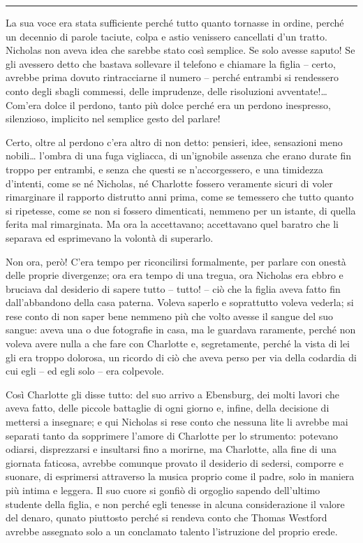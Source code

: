 \plainbreak{1}

La sua voce era stata sufficiente perché tutto quanto tornasse in ordine, perché un decennio di
parole taciute, colpa e astio venissero cancellati d'un tratto. Nicholas non aveva idea che sarebbe
stato così semplice. Se solo avesse saputo! Se gli avessero detto che bastava sollevare il telefono
e chiamare la figlia -- certo, avrebbe prima dovuto rintracciarne il numero -- perché entrambi si
rendessero conto degli sbagli commessi, delle imprudenze, delle risoluzioni avventate!\dots Com'era
dolce il perdono, tanto più dolce perché era un perdono inespresso, silenzioso, implicito nel
semplice gesto del parlare!

Certo, oltre al perdono c'era altro di non detto: pensieri, idee, sensazioni meno nobili\dots
l'ombra di una fuga vigliacca, di un'ignobile assenza che erano durate fin troppo per entrambi, e
senza che questi se n'accorgessero, e una timidezza d'intenti, come se né Nicholas, né Charlotte
fossero veramente sicuri di voler rimarginare il rapporto distrutto anni prima, come se temessero
che tutto quanto si ripetesse, come se non si fossero dimenticati, nemmeno per un istante, di quella
ferita mal rimarginata. Ma ora la accettavano; accettavano quel baratro che li separava ed
esprimevano la volontà di superarlo.

Non ora, però! C'era tempo per riconcilirsi formalmente, per parlare con onestà delle proprie
divergenze; ora era tempo di una tregua, ora Nicholas era ebbro e bruciava dal desiderio di sapere
tutto -- tutto! -- ciò che la figlia aveva fatto fin dall'abbandono della casa paterna. Voleva
saperlo e soprattutto voleva vederla; si rese conto di non saper bene nemmeno più che volto avesse
il sangue del suo sangue: aveva una o due fotografie in casa, ma le guardava raramente, perché non
voleva avere nulla a che fare con Charlotte e, segretamente, perché la vista di lei gli era troppo
dolorosa, un ricordo di ciò che aveva perso per via della codardia di cui egli -- ed egli solo --
era colpevole.

Così Charlotte gli disse tutto: del suo arrivo a Ebensburg, dei molti lavori che aveva fatto, delle
piccole battaglie di ogni giorno e, infine, della decisione di mettersi a insegnare; e qui Nicholas
si rese conto che nessuna lite li avrebbe mai separati tanto da sopprimere l'amore di Charlotte per
lo strumento: potevano odiarsi, disprezzarsi e insultarsi fino a morirne, ma Charlotte, alla fine di
una giornata faticosa, avrebbe comunque provato il desiderio di sedersi, comporre e suonare, di
esprimersi attraverso la musica proprio come il padre, solo in maniera più intima e leggera. Il suo
cuore si gonfiò di orgoglio sapendo dell'ultimo studente della figlia, e non perché egli tenesse in
alcuna considerazione il valore del denaro, qunato piuttosto perché si rendeva conto che Thomas
Westford avrebbe assegnato solo a un conclamato talento l'istruzione del proprio erede.

